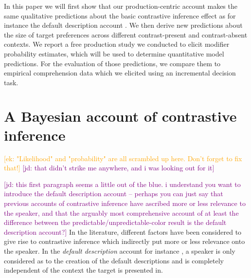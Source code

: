 \documentclass[10pt,letterpaper]{article}
\newcommand{\ek}[1]{\textcolor{Orange}{[ek: #1]}}
\newcommand{\jd}[1]{\textcolor{Purple}{[jd: #1]}}
\begin{document}
In this paper we will first show that our production-centric account makes the same qualitative predictions about the basic contrastive inference effect as for instance the default description account \cite{Sedivy:2003}. We then derive new predictions about the size of target preferences across different contrast-present and contrast-absent contexts. We report a free production study we conducted to elicit modifier probability estimates, which will be used to determine quantitative model predictions. For the evaluation of those predictions, we compare them to empirical comprehension data which we elicited using an incremental decision task.


\section{A Bayesian account of contrastive inference}

\ek{"Likelihood" and "probability" are all scrambled up here. Don't forget to fix that!} \jd{that didn't strike me anywhere, and i was looking out for it}

\jd{this first paragraph seems a little out of the blue. i understand you want to introduce the default description account -- perhaps you can just say that previous accounts of contrastive inference have ascribed more or less relevance to the speaker, and that the arguably most comprehensive account of at least the difference between the predictable/unpredictable-color result is the default description account?}
In the literature, different factors have been considered to give rise to contrastive inference which indirectly put more or less relevance onto the speaker. In the \emph{default description} account for instance \cite{Sedivy:1999}, a speaker is only considered as to the creation of the default descriptions and is completely independent of the context the target is presented in. 

\end{document}

